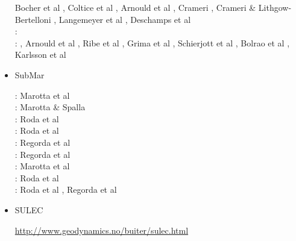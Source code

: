 \begin{itemize}
\begin{scriptsize}
                      Bocher et al \cite{bofc18}, Coltice et al \cite{cold18}, 
                      Arnould et al \cite{arcf18}, Crameri \cite{cram18}, 
                      Crameri \& Lithgow-Bertelloni \cite{crli18}, Langemeyer et al \cite{lalt18}, 
                      Deschamps et al \cite{dert18}\\
\twothousandnineteen: \cite{gult19}\cite{argc19}\cite{deli19}\cite{pact19}\cite{cohf19}\cite{crcm19}\cite{ulcw19}\\
\twothousandtwenty: \cite{lalt20}\cite{gugb20}\cite{yabt20}, Arnould et al \cite{arcf20}, Ribe et al \cite{rits20}, Grima et al \cite{grlc20}, Schierjott et al \cite{scrt20}, Bolrao et al \cite{bobm20}, Karlsson et al \cite{kacc20}
\end{scriptsize}

\item {\codefont SubMar} 

\begin{scriptsize}
\twothousandsix: Marotta et al \cite{masr06}\\
\twothousandseven: Marotta \& Spalla \cite{masp07}\\
\twothousandten: Roda et al \cite{roms10}\\
\twothousandtwelve: Roda et al \cite{rosm12}\\
\twothousandthirteen: Regorda et al \cite{rems13}\\
\twothousandseventeen: Regorda et al \cite{rerm17}\\
\twothousandeighteen: Marotta et al \cite{marc18}\\
\twothousandnineteen: Roda et al \cite{rors19}\\
\twothousandtwenty: Roda et al \cite{rozr20}, Regorda et al \cite{relr20}
\end{scriptsize}


\item {\codefont SULEC} 

\url{http://www.geodynamics.no/buiter/sulec.html}


\end{itemize}
